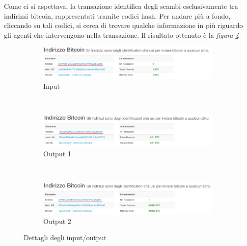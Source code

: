 Come ci si aspettava, la transazione identifica degli scambi esclusivamente tra indirizzi bitcoin, rappresentati tramite codici hash. Per andare più a fondo, cliccando su tali codici, si cerca di trovare qualche informazione in più riguardo gli agenti che intervengono nella transazione. Il risultato ottenuto è la \textit{figura \ref{fig:realtxdetails}}
\newline

\begin{figure}[htbp]
	\centering
	\begin{subfigure}[b]{0.8\textwidth}
		\includegraphics[width=\textwidth]{figure/realtxinput}
		\caption{Input}
		\label{fig:realtxinput}
	\end{subfigure}
	\\
	\begin{subfigure}[b]{0.8 \textwidth}
		\includegraphics[width=\textwidth]{figure/realtxoutput1}
		\caption{Output 1}
		\label{fig:realtxoutput1}
	\end{subfigure}
	\\
	\begin{subfigure}[b]{0.8 \textwidth}
		\includegraphics[width=\textwidth]{figure/realtxoutput2}
		\caption{Output 2}
		\label{fig:realtxoutput2}
	\end{subfigure}
	\caption{Dettagli degli input/output}\label{fig:realtxdetails}
\end{figure}

